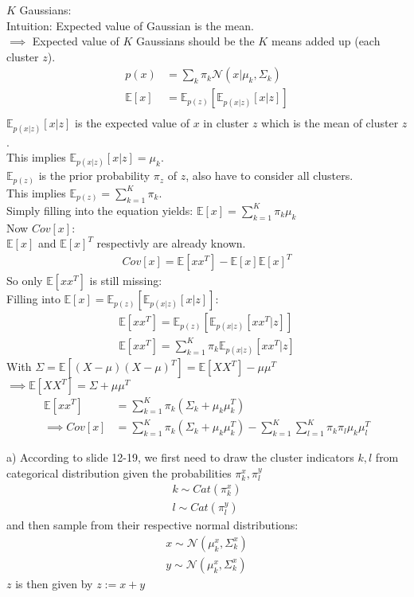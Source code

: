 \begin{flushleft}
$K$ Gaussians:\\
Intuition: Expected value of Gaussian is the mean.\\
$\implies$ Expected value of $K$ Gaussians should be the $K$ means 
added up (each cluster $z$).
\begin{align*}
p(x) &= \sum_{k} \pi_k \mathcal{N}(x | \mu_k , \Sigma_k)\\
\mathbb{E}[x] &= \mathbb{E}_{p(z)} [ \mathbb{E}_{p(x|z)}[x|z]]\\
\end{align*}
$\mathbb{E}_{p(x|z)}[x|z]$ is the expected value of $x$ in cluster 
$z$ which is the mean of cluster $z$.\\
This implies $\mathbb{E}_{p(x|z)}[x|z] = \mu_{k}$.\\
$\mathbb{E}_{p(z)}$ is the prior probability $\pi_z$ of $z$, also have to consider all clusters.\\
This implies $\mathbb{E}_{p(z)} = \sum_{k=1}^{K} \pi_{k}$.\\
Simply filling into the equation yields: 
$\mathbb{E}[x] = \sum_{k=1}^{K} \pi_{k} \mu_k$\\
Now $Cov[x]$:\\
$\mathbb{E}[x]$ and $\mathbb{E}[x]^T$ respectivly are already known.
\begin{align*}
Cov[x] = \mathbb{E}[xx^T] - \mathbb{E}[x] \mathbb{E}[x]^T
\end{align*}
So only $\mathbb{E}[xx^T]$ is still missing:\\
Filling into $\mathbb{E}[x] = \mathbb{E}_{p(z)} [ \mathbb{E}_{p(x|z)}[x|z]]$:
\begin{align*}
\mathbb{E}[xx^T] = \mathbb{E}_{p(z)} [ \mathbb{E}_{p(x|z)}[xx^T|z]]\\
\mathbb{E}[xx^T] = \sum_{k=1}^{K} \pi_{k} \mathbb{E}_{p(x|z)}[xx^T|z]
\end{align*}
With $\Sigma = \mathbb{E}[(X - \mu) (X - \mu)^T] = \mathbb{E}[XX^T] - \mu \mu^T$\\
$\implies \mathbb{E}[XX^T] = \Sigma + \mu \mu^T$
\begin{align*}
\mathbb{E}[xx^T] &= \sum_{k=1}^{K} \pi_{k} (\Sigma_k + \mu_k \mu_k^T)\\
\implies Cov[x] &= \sum_{k=1}^{K} \pi_{k} (\Sigma_k + \mu_k \mu_k^T) - 
\sum_{k=1}^K \sum_{l=1}^K \pi_k \pi_l \mu_k \mu_l^T
\end{align*}
\end{flushleft}
%
%
%
\begin{flushleft}
a) According to slide 12-19, we first need to draw the cluster indicators $k, l$ from categorical distribution given the probabilities $\pi_k^x, \pi_l^y$
\begin{align*}
 k \sim Cat(\pi_k^x) \\
 l \sim Cat(\pi_l^y) 
\end{align*}
and then sample from their respective normal distributions:
\begin{align*}
 x \sim \mathcal{N}(\mu_k^x, \Sigma_k^x) \\
 y \sim \mathcal{N}(\mu_k^x, \Sigma_k^x)
\end{align*}
$z$ is then given by $z := x + y$
\end{flushleft}

